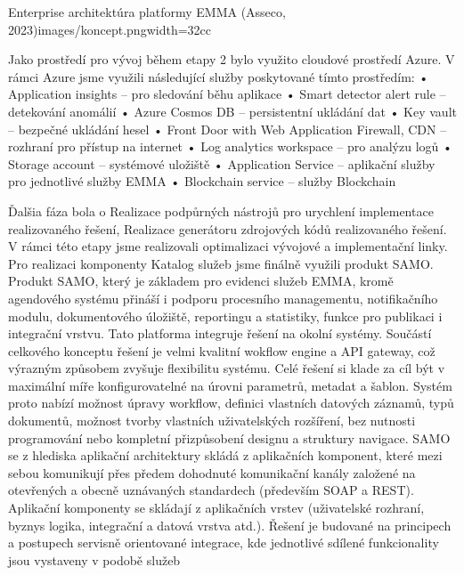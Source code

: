 {Enterprise architektúra platformy EMMA  (Asseco, 2023)}{images/koncept.png}{width=32cc}

Jako prostředí pro vývoj během etapy 2 bylo využito cloudové prostředí Azure.
V rámci Azure jsme využili následující služby poskytované tímto prostředím:
• Application insights – pro sledování běhu aplikace
• Smart detector alert rule – detekování anomálií 
• Azure Cosmos DB – persistentní ukládání dat
• Key vault – bezpečné ukládání hesel
• Front Door with Web Application Firewall, CDN – rozhraní pro přístup na internet
• Log analytics workspace – pro analýzu logů
• Storage account – systémové uložiště
• Application Service – aplikační služby pro jednotlivé služby EMMA
• Blockchain service – služby Blockchain


Ďalšia fáza bola o Realizace podpůrných nástrojů pro urychlení implementace realizovaného řešení, Realizace generátoru zdrojových kódů realizovaného řešení. V rámci této etapy jsme realizovali optimalizaci vývojové a implementační linky. Pro realizaci komponenty 
Katalog služeb jsme finálně využili produkt SAMO. 
Produkt SAMO, který je základem pro evidenci služeb EMMA, kromě agendového systému přináší i 
podporu procesního managementu, notifikačního modulu, dokumentového úložiště, reportingu a 
statistiky, funkce pro publikaci i integrační vrstvu. Tato platforma integruje řešení na okolní systémy. 
Součástí celkového konceptu řešení je velmi kvalitní wokflow engine a API gateway, což výrazným 
způsobem zvyšuje flexibilitu systému. Celé řešení si klade za cíl být v maximální míře konfigurovatelné na 
úrovni parametrů, metadat a šablon. Systém proto nabízí možnost úpravy workflow, definici vlastních 
datových záznamů, typů dokumentů, možnost tvorby vlastních uživatelských rozšíření, bez nutnosti 
programování nebo kompletní přizpůsobení designu a struktury navigace. SAMO se z hlediska aplikační 
architektury skládá z aplikačních komponent, které mezi sebou komunikují přes předem dohodnuté 
komunikační kanály založené na otevřených a obecně uznávaných standardech (především SOAP a REST). 
Aplikační komponenty se skládají z aplikačních vrstev (uživatelské rozhraní, byznys logika, integrační a 
datová vrstva atd.). Řešení je budované na principech a postupech servisně orientované integrace, kde 
jednotlivé sdílené funkcionality jsou vystaveny v podobě služeb

